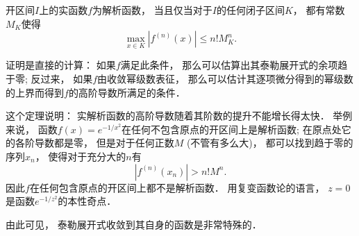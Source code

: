 \begin{theorem}{}
开区间$I$上的实函数$f$为解析函数， 当且仅当对于$I$的任何闭子区间$K$， 都有常数$M_K$使得
$$
\max_{x\in K}|f^{(n)}(x)|\leq n!M_K^n.
$$
\end{theorem}

证明是直接的计算： 如果$f$满足此条件， 那么可以估算出其泰勒展开式的余项趋于零; 反过来， 如果$f$由收敛幂级数表征， 那么可以估计其逐项微分得到的幂级数的上界而得到$f$的高阶导数所满足的条件．

这个定理说明： 实解析函数的高阶导数随着其阶数的提升不能增长得太快． 举例来说， 函数$f(x)=e^{-1/x^2}$在任何不包含原点的开区间上是解析函数; 在原点处它的各阶导数都是零， 但是对于任何正数$M$ (不管有多么大)， 都可以找到趋于零的序列$x_n$， 使得对于充分大的$n$有
$$
|f^{(n)}(x_n)|>n!M^n.
$$
因此$f$在任何包含原点的开区间上都不是解析函数． 用复变函数论的语言， $z=0$是函数$e^{-1/z^2}$的本性奇点．

由此可见， 泰勒展开式收敛到其自身的函数是非常特殊的．
